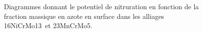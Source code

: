 \begin{figure}[!ht]
  \centering
   \hfill 

  \caption{\label{fig:diagrammes_kn}Diagrammes donnant le potentiel de nitruration en fonction de la fraction massique en azote en surface dans les alliages 16NiCrMo13 et 23MnCrMo5.}
\end{figure}

